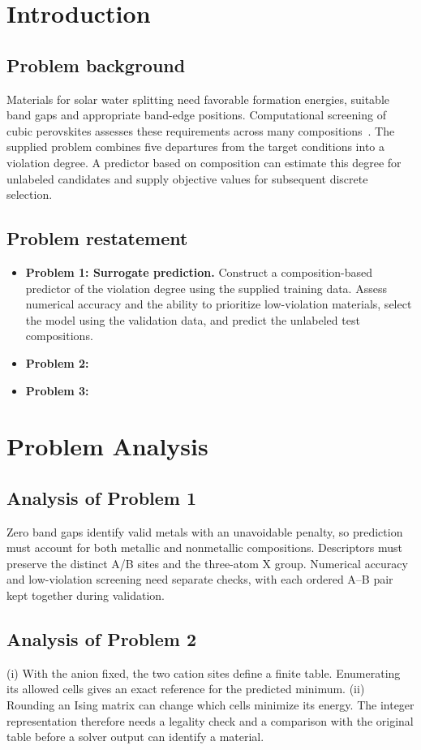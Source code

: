 \section{Introduction}
\subsection{Problem background}
Materials for solar water splitting need favorable formation energies, suitable band gaps and appropriate band-edge positions. Computational screening of cubic perovskites assesses these requirements across many compositions~\cite{castelli2012}. The supplied problem combines five departures from the target conditions into a violation degree. A predictor based on composition can estimate this degree for unlabeled candidates and supply objective values for subsequent discrete selection.

\subsection{Problem restatement}
\begin{itemize}
  \item \textbf{Problem 1: Surrogate prediction.} Construct a composition-based predictor of the violation degree using the supplied training data. Assess numerical accuracy and the ability to prioritize low-violation materials, select the model using the validation data, and predict the unlabeled test compositions.
  \item \textbf{Problem 2:}
  \item \textbf{Problem 3:}
\end{itemize}

\section{Problem Analysis}
\subsection{Analysis of Problem 1}
Zero band gaps identify valid metals with an unavoidable penalty, so prediction must account for both metallic and nonmetallic compositions. Descriptors must preserve the distinct A/B sites and the three-atom X group. Numerical accuracy and low-violation screening need separate checks, with each ordered A--B pair kept together during validation.
\subsection{Analysis of Problem 2}
(i) With the anion fixed, the two cation sites define a finite table. Enumerating its allowed cells gives an exact reference for the predicted minimum. (ii) Rounding an Ising matrix can change which cells minimize its energy. The integer representation therefore needs a legality check and a comparison with the original table before a solver output can identify a material.

